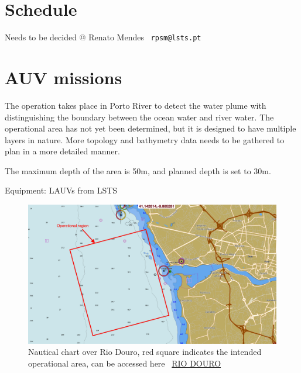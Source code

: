 \documentclass{article}
\begin{document}

\section*{Schedule} %
Needs to be decided @ Renato Mendes \   \texttt{rpsm@lsts.pt}


\section*{AUV missions}
The operation takes place in Porto River to detect the water plume with distinguishing the boundary between the ocean water and river water. The operational area has not yet been determined, but it is designed to have multiple layers in nature. More topology and bathymetry data needs to be gathered to plan in a more detailed manner.

The maximum depth of the area is 50m, and planned depth is set to 30m.

Equipment: LAUVs from LSTS

\begin{figure}
    \centering
    \includegraphics[width = \textwidth]{nautical_1.png}
    \caption{Nautical chart over Rio Douro, red square indicates the intended operational area, can be accessed here \ \href{http://fishing-app.gpsnauticalcharts.com/i-boating-fishing-web-app/fishing-marine-charts-navigation.html?title=Approaches+to+Leixoes+and+Barra+do+Rio+Douro+boating+app#12.74/41.1426/-8.6853}{RIO DOURO}}
    \label{fig:rio_douro}
\end{figure}
\end{document}
